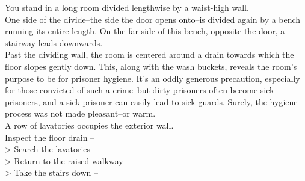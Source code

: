 You stand in a long room divided lengthwise by a waist-high wall.\\

One side of the divide--the side the door opens onto--is divided again by a bench running its entire length. On the far side of this bench, opposite the door, a stairway leads downwards.\\

Past the dividing wall, the room is centered around a drain towards which the floor slopes gently down. This, along with the wash buckets, reveals the room’s purpose to be for prisoner hygiene. It’s an oddly generous precaution, especially for those convicted of such a crime--but dirty prisoners often become sick prisoners, and a sick prisoner can easily lead to sick guards. Surely, the hygiene process was not made pleasant--or warm.\\

A row of lavatories occupies the exterior wall.\\

 Inspect the floor drain -- \\
> Search the lavatories -- \\
> Return to the raised walkway -- \\
> Take the stairs down -- 